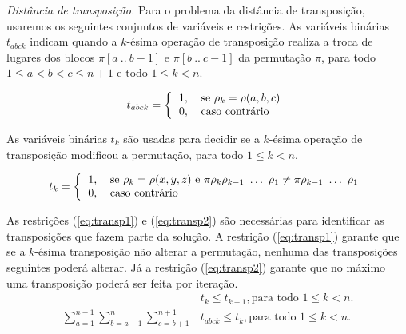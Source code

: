 \textit{Distância de transposição.}
Para o problema da distância de transposição, usaremos os seguintes
conjuntos de variáveis e restrições. As variáveis binárias $t_{abck}$
indicam quando a $k$-ésima operação de transposição realiza a troca de
lugares dos blocos $\pi[a~..~b - 1]$ e $\pi[b~..~c - 1]$ da
permutação $\pi$, para todo $1 \le a < b < c \le n + 1$ e todo $ 1 \le
k < n$.

\[ 
  t_{abck} = \left \{ 
  \begin{tabular}{ll} 
  1, & se $\rho_{k} = \rho(a,b,c)$ \\ 
  0, & caso contrário 
  \end{tabular} \right .
\] 

As variáveis binárias $t_{k}$ são usadas para decidir se a $k$-ésima
operação de transposição modificou a permutação, para todo $ 1 \le k <
n$.

\[ 
  t_{k} = \left \{ 
  \begin{tabular}{ll} 
  1, & se $\rho_{k} = \rho(x,y,z)$ e
  $\pi \rho_{k} \rho_{k-1}~\ldots~\rho_{1} \neq \pi \rho_{k-1}~\ldots~\rho_{1}$\\
  0, & caso contrário 
  \end{tabular} \right .
\]

As restrições (\ref{eq:transp1}) e (\ref{eq:transp2}) são necessárias
para identificar as transposições que fazem parte da solução. A
restrição (\ref{eq:transp1}) garante que se a $k$-ésima transposição
não alterar a permutação, nenhuma das transposições seguintes poderá
alterar. Já a restrição (\ref{eq:transp2}) garante que no máximo uma
transposição poderá ser feita por iteração.
\begin{align}
  &t_{k} \le t_{k-1}, \text{para todo $1 \le k <
  n$}. \label{eq:transp1} \\
  \sum_{a=1}^{n-1}\sum_{b=a+1}^{n}\sum_{c=b+1}^{n+1} &t_{abck} \le
  t_{k} , \text{para todo $1 \le k <
  n$}. \label{eq:transp2} 
\end{align}

